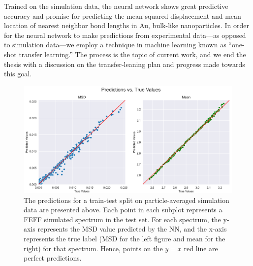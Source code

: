 Trained on the simulation data, the neural network shows great predictive accuracy and promise for predicting the mean squared displacement and mean location of nearest neighbor bond lengths in Au, bulk-like nanoparticles. In order for the neural network to make predictions from experimental data---as opposed to simulation data---we employ a technique in machine learning known as ``one-shot transfer learning.'' The process is the topic of current work, and we end the thesis with a discussion on the transfer-leaning plan and progress made towards this goal.


\begin{figure}
    \centering
    \includegraphics[width=\linewidth]{Chapters/Figures/nn_rdf_validation_preds-fixed-just-msd-and-mean.png}
    \caption[Simulation Test Set Predictions]{The predictions for a train-test split on particle-averaged simulation data are presented above. Each point in each subplot represents a FEFF simulated spectrum in the test set. For each spectrum, the y-axis represents the MSD value predicted by the NN, and the x-axis represents the true label (MSD for the left figure and mean for the right) for that spectrum. Hence, points on the $ y=x $ red line are perfect predictions.}
    \label{fig:train-test-split-just-msd-and-mean}
\end{figure}
